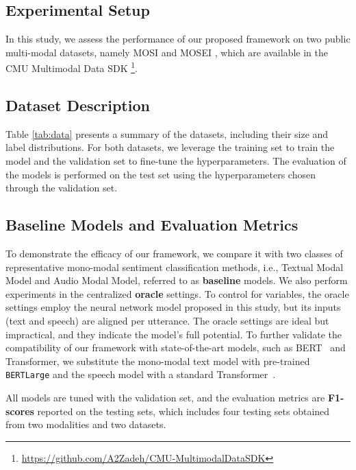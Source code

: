 \documentclass[11pt]{article}
\begin{document}
\subsection{Experimental Setup}
In this study, we assess the performance of our proposed framework on two public multi-modal datasets, namely MOSI \cite{zadeh2016mosi} and MOSEI \cite{zadeh2018multimodal}, which are available in the CMU Multimodal Data SDK \footnote{\url{https://github.com/A2Zadeh/CMU-MultimodalDataSDK}}.

\subsection{Dataset Description}
\label{sec:data}
Table \ref{tab:data} presents a summary of the datasets, including their size and label distributions. For both datasets, we leverage the training set to train the model and the validation set to fine-tune the hyperparameters. The evaluation of the models is performed on the test set using the hyperparameters chosen through the validation set.


\subsection{Baseline Models and Evaluation Metrics}
\label{sec:monomodal}
To demonstrate the efficacy of our framework, we compare it with two classes of representative mono-modal sentiment classification methods, i.e., {Textual Modal Model} and {Audio Modal Model}, referred to as \textbf{baseline} models. We also perform experiments in the centralized \textbf{oracle} settings. To control for variables, the oracle settings employ the neural network model proposed in this study, but its inputs (text and speech) are aligned per utterance. The oracle settings are ideal but impractical, and they indicate the model's full potential. To further validate the compatibility of our framework with state-of-the-art models, such as BERT~\cite{devlin2018bert} and Transformer, we substitute the mono-modal text model with pre-trained \texttt{BERTLarge} and the speech model with a standard Transformer~\cite{vaswani2017attention}.

All models are tuned with the validation set, and the evaluation metrics are \textbf{F1-scores} reported on the testing sets, which includes four testing sets obtained from two modalities and two datasets.
\end{document}

